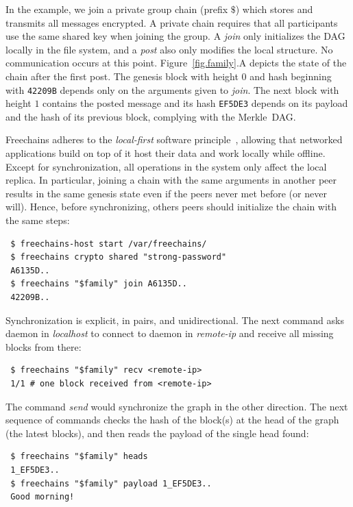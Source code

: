 \documentclass[10pt,journal,compsoc]{IEEEtran}
\newcommand{\FC} {Freechains\xspace}
\begin{document}
In the example, we join a private group chain (prefix $\$$) which stores and
transmits all messages encrypted.
A private chain requires that all participants use the same shared key when
joining the group.
A \emph{join} only initializes the DAG locally in the file system, and a
\emph{post} also only modifies the local structure.
No communication occurs at this point.
Figure~\ref{fig.family}.A depicts the state of the chain after the first post.
The genesis block with height $0$ and hash beginning with \texttt{42209B}
depends only on the arguments given to \emph{join}.
The next block with height $1$ contains the posted message and its hash
\texttt{EF5DE3} depends on its payload and the hash of its previous block,
complying with the Merkle~DAG.

\FC adheres to the \emph{local-first} software principle~\cite{p2p.local},
allowing that networked applications build on top of it host their data and
work locally while offline.
Except for synchronization, all operations in the system only affect the local
replica.
In particular, joining a chain with the same arguments in another peer results
in the same genesis state even if the peers never met before (or never will).
Hence, before synchronizing, others peers should initialize the chain with the
same steps:

{\footnotesize
\begin{verbatim}
 $ freechains-host start /var/freechains/
 $ freechains crypto shared "strong-password"
 A6135D..
 $ freechains "$family" join A6135D..
 42209B..
\end{verbatim}
}

Synchronization is explicit, in pairs, and unidirectional.
The next command asks daemon in \emph{localhost} to connect to daemon in
\emph{remote-ip} and receive all missing blocks from there:

{\footnotesize
\begin{verbatim}
 $ freechains "$family" recv <remote-ip>
 1/1 # one block received from <remote-ip>
\end{verbatim}
}

The command \emph{send} would synchronize the graph in the other direction.
The next sequence of commands checks the hash of the block(s) at the head of
the graph (the latest blocks), and then reads the payload of the single head
found:

{\footnotesize
\begin{verbatim}
 $ freechains "$family" heads
 1_EF5DE3..
 $ freechains "$family" payload 1_EF5DE3..
 Good morning!
\end{verbatim}
}
\end{document}
